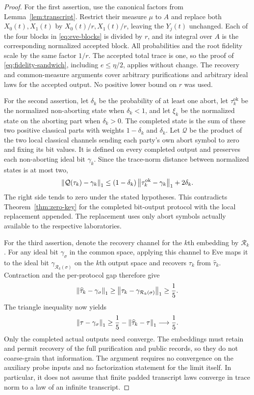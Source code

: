 \begin{proof}
For the first assertion, use the canonical factors from
Lemma~\ref{lem:transcript}.  Restrict their measure $\mu$ to $A$ and
replace both $X_0(t),X_1(t)$ by $X_0(t)/r,X_1(t)/r$, leaving the
$Y_j(t)$ unchanged.  Each of the four blocks in
\eqref{eq:eve-blocks} is divided by $r$, and its integral over $A$ is
the corresponding normalized accepted block.  All probabilities and
the root fidelity scale by the same factor $1/r$.  The accepted total
trace is one, so the proof of \eqref{eq:fidelity-sandwich}, including
$e\le\eta/2$, applies without change.  The recovery and common-measure
arguments cover arbitrary purifications and arbitrary ideal laws for
the accepted output.  No positive lower bound on $r$ was used.

For the second assertion, let $\delta_k$ be the probability of at
least one abort, let $\tau_k^{\mathrm{ok}}$ be the normalized
non-aborting state when $\delta_k<1$, and let $\xi_k$ be the normalized
state on the aborting part when $\delta_k>0$.  The completed state is
the sum of these two positive classical parts with weights
$1-\delta_k$ and $\delta_k$.  Let $\mathcal Q$ be the product of the
two local classical channels sending each party's own abort symbol to
zero and fixing its bit values.  It is defined on every completed
output and preserves each non-aborting ideal bit $\gamma_k$.  Since
the trace-norm distance between normalized states is at most two,
\[
 \left\lVert\mathcal Q(\tau_k)-\gamma_k\right\rVert_1
 \le (1-\delta_k)\left\lVert\tau_k^{\mathrm{ok}}-\gamma_k\right\rVert_1
       +2\delta_k.
\]
The right side tends to zero under the stated hypotheses.  This
contradicts Theorem~\ref{thm:zero-key} for the completed bit-output
protocol with the local replacement appended.  The replacement uses
only abort symbols actually available to the respective laboratories.

For the third assertion, denote the recovery channel for the $k$th
embedding by $\mathcal R_k$.  For any ideal bit $\gamma_\sigma$ in the
common space, applying this channel to Eve maps it to the ideal bit
$\gamma_{\mathcal R_k(\sigma)}$ on the $k$th output space and recovers
$\tau_k$ from $\widehat\tau_k$.  Contraction and the per-protocol gap
therefore give
\[
 \left\lVert\widehat\tau_k-\gamma_\sigma\right\rVert_1
 \ge\left\lVert\tau_k-\gamma_{\mathcal R_k(\sigma)}\right\rVert_1
 \ge\frac15.
\]
The triangle inequality now yields
\[
 \left\lVert\tau-\gamma_\sigma\right\rVert_1
 \ge\frac15-\left\lVert\widehat\tau_k-\tau\right\rVert_1
 \longrightarrow\frac15.
\]
Only the completed actual outputs need converge.  The embeddings must
retain and permit recovery of the full purification and public records,
so they do not coarse-grain that information.  The argument requires
no convergence on the auxiliary probe inputs and no factorization
statement for the limit itself.  In particular, it does not assume
that finite padded transcript laws converge in trace norm to a law of
an infinite transcript.
\end{proof}
